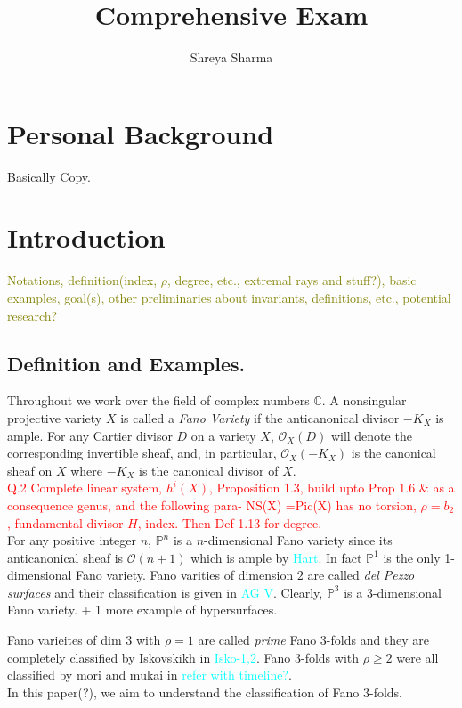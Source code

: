 \documentclass[12pt]{amsart}
\theoremstyle{plain}
\theoremstyle{definition}
\theoremstyle{expl}
\begin{document}
	\title{\large{Comprehensive Exam}}
	\date{}
	\author{\small{Shreya Sharma}}
	\maketitle
	\tableofcontents
	
\section{Personal Background}
\noindent Basically Copy.
\section{Introduction}
\textcolor{olive}{Notations, definition(index, $\rho$, degree, etc., extremal rays and stuff?), basic examples, goal(s), other preliminaries about invariants, definitions, etc., potential research?}
\subsection{Definition and Examples.} Throughout we work over the field of complex numbers $\mathbb{C}$.
A nonsingular projective variety $X$ is called a \textit{Fano Variety} if the anticanonical divisor $-K_X$ is ample.
For any Cartier divisor $D$ on a variety $X$, $\mathcal{O}_X(D)$ will denote the corresponding invertible sheaf, and, in particular, $\mathcal{O}_X(-K_X)$ is the canonical sheaf on $X$ where $-K_X$ is the canonical divisor of $X$. \\
	\textcolor{red}{ Q.2 Complete linear system, $h^i(X)$, Proposition 1.3, build upto Prop 1.6 \& as a consequence genus, and the following para- NS(X) =Pic(X) has no torsion, $\rho=b_2$, fundamental divisor $H$, index. Then Def 1.13 for degree.}\\
For any positive integer $n$,  $\mathbb{P}^n$ is a $n$-dimensional Fano variety since its anticanonical sheaf is $\mathcal{O}(n+1)$ which is ample by \textcolor{cyan}{Hart}. In fact $\mathbb{P}^1$ is the only 1-dimensional Fano variety. Fano varities of dimension $2$ are called \textit{del Pezzo surfaces} and their classification is given in \textcolor{cyan}{AG V}. Clearly, $\mathbb{P}^3$ is a $3$-dimensional Fano variety. + 1 more example of hypersurfaces.

\noindent Fano varieites of dim $3$ with $\rho =1$ are called \textit{prime} Fano $3$-folds and they are completely classified by Iskovskikh in \textcolor{cyan}{Isko-1,2}. Fano $3$-folds with $\rho\geq 2$ were all classified by mori and mukai in \textcolor{cyan}{refer with timeline?}. \\
In this paper(?), we aim to understand the classification of Fano $3$-folds. 
\end{document}
